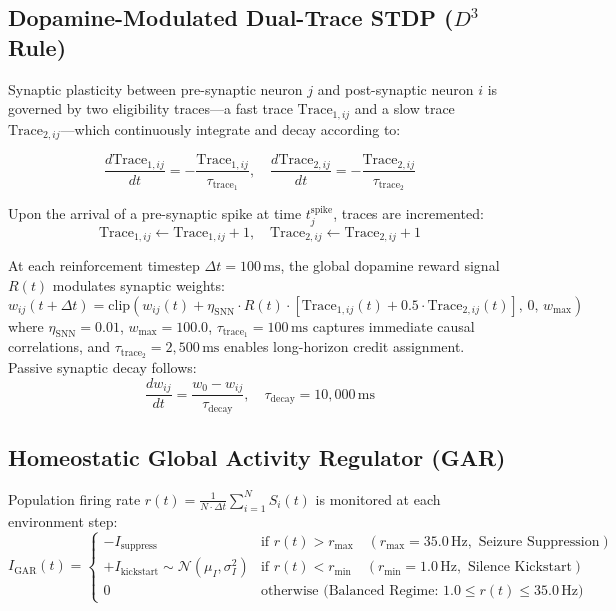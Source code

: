 \documentclass[utf8]{frontiers_suppmat}
\begin{document}
\subsection{Dopamine-Modulated Dual-Trace STDP ($D^3$ Rule)}
Synaptic plasticity between pre-synaptic neuron $j$ and post-synaptic neuron $i$ is governed by two eligibility traces—a fast trace $\text{Trace}_{1,ij}$ and a slow trace $\text{Trace}_{2,ij}$—which continuously integrate and decay according to:

\begin{equation}
\frac{d\text{Trace}_{1,ij}}{dt} = -\frac{\text{Trace}_{1,ij}}{\tau_{\text{trace}_1}}, \quad \frac{d\text{Trace}_{2,ij}}{dt} = -\frac{\text{Trace}_{2,ij}}{\tau_{\text{trace}_2}}
\end{equation}

Upon the arrival of a pre-synaptic spike at time $t_j^{\text{spike}}$, traces are incremented:
\begin{equation}
\text{Trace}_{1,ij} \leftarrow \text{Trace}_{1,ij} + 1, \quad \text{Trace}_{2,ij} \leftarrow \text{Trace}_{2,ij} + 1
\end{equation}

At each reinforcement timestep $\Delta t = 100\,\text{ms}$, the global dopamine reward signal $R(t)$ modulates synaptic weights:
\begin{equation}
w_{ij}(t + \Delta t) = \text{clip}\left( w_{ij}(t) + \eta_{\text{SNN}} \cdot R(t) \cdot \left[ \text{Trace}_{1,ij}(t) + 0.5 \cdot \text{Trace}_{2,ij}(t) \right], \, 0, \, w_{\text{max}} \right)
\end{equation}
where $\eta_{\text{SNN}} = 0.01$, $w_{\text{max}} = 100.0$, $\tau_{\text{trace}_1} = 100\,\text{ms}$ captures immediate causal correlations, and $\tau_{\text{trace}_2} = 2{,}500\,\text{ms}$ enables long-horizon credit assignment. Passive synaptic decay follows:
\begin{equation}
\frac{dw_{ij}}{dt} = \frac{w_0 - w_{ij}}{\tau_{\text{decay}}}, \quad \tau_{\text{decay}} = 10{,}000\,\text{ms}
\end{equation}

\subsection{Homeostatic Global Activity Regulator (GAR)}
Population firing rate $r(t) = \frac{1}{N \cdot \Delta t} \sum_{i=1}^N S_i(t)$ is monitored at each environment step:
\begin{equation}
I_{\text{GAR}}(t) = \begin{cases}
-I_{\text{suppress}} & \text{if } r(t) > r_{\text{max}} \quad (r_{\text{max}} = 35.0\,\text{Hz}, \text{ Seizure Suppression}) \\
+I_{\text{kickstart}} \sim \mathcal{N}(\mu_I, \sigma_I^2) & \text{if } r(t) < r_{\text{min}} \quad (r_{\text{min}} = 1.0\,\text{Hz}, \text{ Silence Kickstart}) \\
0 & \text{otherwise (Balanced Regime: } 1.0 \le r(t) \le 35.0\,\text{Hz})
\end{cases}
\end{equation}
\end{document}

